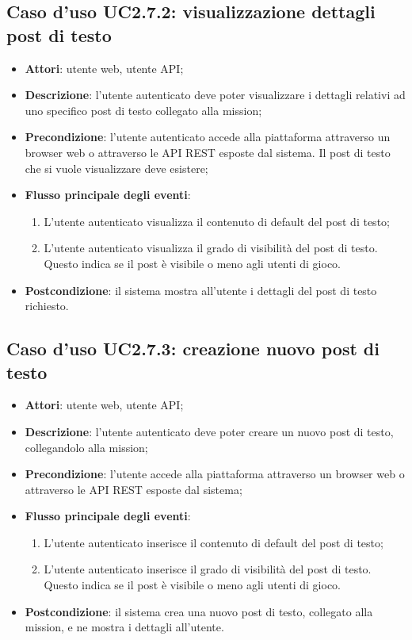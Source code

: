 \subsection{Caso d'uso UC2.7.2: visualizzazione dettagli post di testo}
\begin{itemize}
\item \textbf{Attori}: utente web, utente API;
\item \textbf{Descrizione}: l'utente autenticato deve poter visualizzare i dettagli relativi ad uno specifico post di testo collegato alla mission; 
      \item \textbf{Precondizione}: l'utente autenticato accede alla piattaforma attraverso un browser web o attraverso le API REST esposte dal sistema. Il post di testo che si vuole visualizzare deve esistere;

        \item \textbf{Flusso principale degli eventi}:
          \begin{enumerate}
          \item L'utente autenticato visualizza il contenuto di default del post di testo;
          \item L'utente autenticato visualizza il grado di visibilità del post di testo. Questo indica se il post è visibile o meno agli utenti di gioco.

      \end{enumerate}
    \item \textbf{Postcondizione}: il sistema mostra all'utente i dettagli del post di testo richiesto.
  \end{itemize}
\hypertarget{UC2.7.3}{}
\subsection{Caso d'uso UC2.7.3: creazione nuovo post di testo}
\begin{itemize}
\item \textbf{Attori}: utente web, utente API;
\item \textbf{Descrizione}: l'utente autenticato deve poter creare un nuovo post di testo, collegandolo alla mission; 
      \item \textbf{Precondizione}: l'utente accede alla piattaforma attraverso un browser web o attraverso le API REST esposte dal sistema;

        \item \textbf{Flusso principale degli eventi}:
          \begin{enumerate}
          \item L'utente autenticato inserisce il contenuto di default del post di testo;
          \item L'utente autenticato inserisce il grado di visibilità del post di testo. Questo indica se il post è visibile o meno agli utenti di gioco.

      \end{enumerate}
    \item \textbf{Postcondizione}: il sistema crea una nuovo post di testo, collegato alla mission, e ne mostra i dettagli all'utente.
  \end{itemize}
\hypertarget{UC2.7.4}{}
